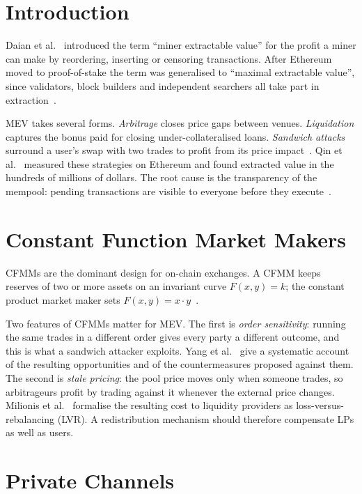 \section{Introduction}

Daian et al.~\cite{daian2020flash} introduced the term ``miner extractable value'' for the profit a miner can make by reordering, inserting or censoring transactions. After Ethereum moved to proof-of-stake the term was generalised to ``maximal extractable value'', since validators, block builders and independent searchers all take part in extraction~\cite{yang2022sok}.

MEV takes several forms. \emph{Arbitrage} closes price gaps between venues. \emph{Liquidation} captures the bonus paid for closing under-collateralised loans. \emph{Sandwich attacks} surround a user's swap with two trades to profit from its price impact~\cite{zhou2021high}. Qin et al.~\cite{qin2022quantifying} measured these strategies on Ethereum and found extracted value in the hundreds of millions of dollars. The root cause is the transparency of the mempool: pending transactions are visible to everyone before they execute~\cite{lyu2022empirical}.

\section{Constant Function Market Makers}

CFMMs are the dominant design for on-chain exchanges. A CFMM keeps reserves of two or more assets on an invariant curve $F(x,y)=k$; the constant product market maker sets $F(x,y)=x\cdot y$~\cite{angeris2020improved,adams2020uniswap}.

Two features of CFMMs matter for MEV. The first is \emph{order sensitivity}: running the same trades in a different order gives every party a different outcome, and this is what a sandwich attacker exploits. Yang et al.~\cite{yang2022sok} give a systematic account of the resulting opportunities and of the countermeasures proposed against them. The second is \emph{stale pricing}: the pool price moves only when someone trades, so arbitrageurs profit by trading against it whenever the external price changes. Milionis et al.~\cite{milionis2022lvr} formalise the resulting cost to liquidity providers as loss-versus-rebalancing (LVR). A redistribution mechanism should therefore compensate LPs as well as users.

\section{Private Channels}

